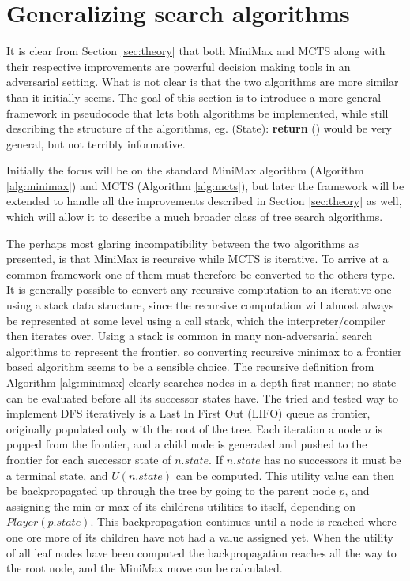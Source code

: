 \section{Generalizing search algorithms}

It is clear from Section \ref{sec:theory} that both MiniMax and MCTS along with their respective improvements are powerful decision making tools in an adversarial setting. What is not clear is that the two algorithms are more similar than it initially seems. The goal of this section is to introduce a more general framework in pseudocode that lets both algorithms be  implemented, while still describing the structure of the algorithms, eg. (State): \textbf{return} () would be very general, but not terribly informative.

Initially the focus will be on the standard MiniMax algorithm (Algorithm \ref{alg:minimax}) and MCTS (Algorithm \ref{alg:mcts}), but later the framework will be extended to handle all the improvements described in Section \ref{sec:theory} as well, which will allow it to describe a much broader class of tree search algorithms.

The perhaps most glaring incompatibility between the two algorithms as presented, is that MiniMax is recursive while MCTS is iterative. To arrive at a common framework one of them must therefore be converted to the others type. It is generally possible to convert any recursive computation to an iterative one using a stack data structure, since the recursive computation will almost always be represented at some level using a call stack, which the interpreter/compiler then iterates over. Using a stack is common in many non-adversarial search algorithms to represent the frontier, so converting recursive minimax to a frontier based algorithm seems to be a sensible choice. The recursive definition from Algorithm \ref{alg:minimax} clearly searches nodes in a depth first manner; no state can be evaluated before all its successor states have. The tried and tested way to implement DFS iteratively is a Last In First Out (LIFO) queue as frontier, originally populated only with the root of the tree. Each iteration a node $n$ is popped from the frontier, and a child node is generated and pushed to the frontier for each successor state of $n.state$. If $n.state$ has no successors it must be a terminal state, and $U(n.state)$ can be computed. This utility value can then be backpropagated up through the tree by going to the parent node $p$, and assigning the min or max of its childrens utilities to itself, depending on $Player(p.state)$. This backpropagation continues until a node is reached where one ore more of its children have not had a value assigned yet. When the utility of all leaf nodes have been computed the backpropagation reaches all the way to the root node, and the MiniMax move can be calculated.

